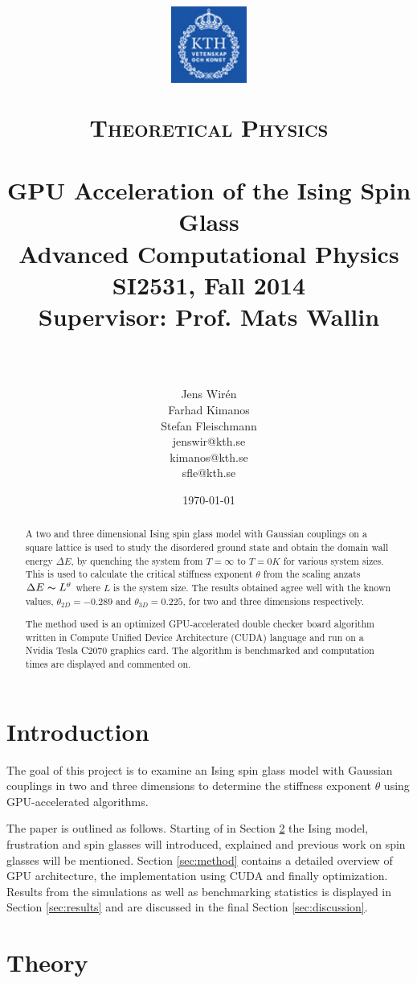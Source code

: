 \documentclass[paper=a4, fontsize=11pt]{scrartcl} %
\title{
\vspace{-2.5cm}
\begin{center}
\includegraphics[width=2.5cm]{logo-kth.png}\\[-1mm]
\hspace{-3mm}
\end{center}
\normalfont \normalsize
\textsc{Theoretical Physics} \\ [25pt] %
\horrule{0.5pt} \\[0.4cm] %
\huge GPU Acceleration of the Ising Spin Glass \\ %
\Large Advanced Computational Physics\\ %
\Large SI2531, Fall 2014\\ %
\Large Supervisor: Prof. Mats Wallin \\ %
\horrule{2pt} \\[0.5cm] %
}
\author{Jens Wir\'{e}n \\
Farhad Kimanos \\
Stefan Fleischmann \\
\normalsize jenswir@kth.se \\
\normalsize kimanos@kth.se \\
\normalsize sfle@kth.se} %
\date{\normalsize\today} %
\numberwithin{equation}{section} %
\numberwithin{figure}{section} %
\numberwithin{table}{section} %
\begin{document}
\maketitle %


\begin{abstract}
A two and three dimensional Ising spin glass model with Gaussian couplings on a square lattice is used to study the disordered ground state and obtain the domain wall energy $\Delta E$, by quenching the system from $T=\infty$ to $T=0 K$ for various system sizes. This is used to calculate the critical stiffness exponent $\theta$ from the scaling anzats $\Delta E \thicksim L^\theta$ where $L$ is the system size. The results obtained agree well with the known values, $\theta_{2D}=-0.289$ and $\theta_{3D}=0.225$, for two and three dimensions respectively.

The method used is an optimized GPU-accelerated double checker board algorithm written in Compute Unified Device Architecture (CUDA) language and run on a Nvidia Tesla C2070 graphics card. The algorithm is benchmarked and computation times are displayed and commented on.
\end{abstract}

\pagebreak

\section{Introduction}

The goal of this project is to examine an Ising spin glass model with Gaussian couplings in two and three dimensions to determine the stiffness exponent $\theta$ using GPU-accelerated algorithms. 

The paper is outlined as follows. Starting of in Section \ref{sec:theory} the Ising model, frustration and spin glasses will introduced, explained and previous work on spin glasses will be mentioned. Section \ref{sec:method} contains a detailed overview of GPU architecture, the implementation using CUDA and finally optimization. Results from the simulations as well as benchmarking statistics is displayed in Section \ref{sec:results} and are discussed in the final Section \ref{sec:discussion}.

\section{Theory}
\label{sec:theory}
\end{document}
